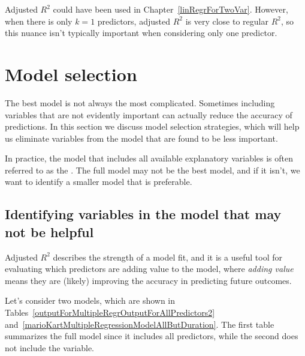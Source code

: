 Adjusted $R^2$ could have been used in Chapter~\ref{linRegrForTwoVar}. However, when there is only $k = 1$ predictors, adjusted $R^2$ is very close to regular $R^2$, so this nuance isn't typically important when considering only one predictor.






\section{Model selection}
\label{introductionToMultipleRegression}


\label{modelSelection}


The best model is not always the most complicated. Sometimes including variables that are not evidently important can actually reduce the accuracy of predictions. In this section we discuss model selection strategies, which will help us eliminate variables from the model that are found to be less important.

In practice, the model that includes all available explanatory variables is often referred to as the . The full model may not be the best model, and if it isn't, we want to identify a smaller model that is preferable.


\subsection{Identifying variables in the model that may not be helpful}

Adjusted $R^2$ describes the strength of a model fit, and it is a useful tool for evaluating which predictors are adding value to the model, where \emph{adding value} means they are (likely) improving the accuracy in predicting future outcomes.

Let's consider two models, which are shown in Tables~\ref{outputForMultipleRegrOutputForAllPredictors2} and~\ref{marioKartMultipleRegressionModelAllButDuration}. The first table summarizes the full model since it includes all predictors, while the second does not include the  variable.


